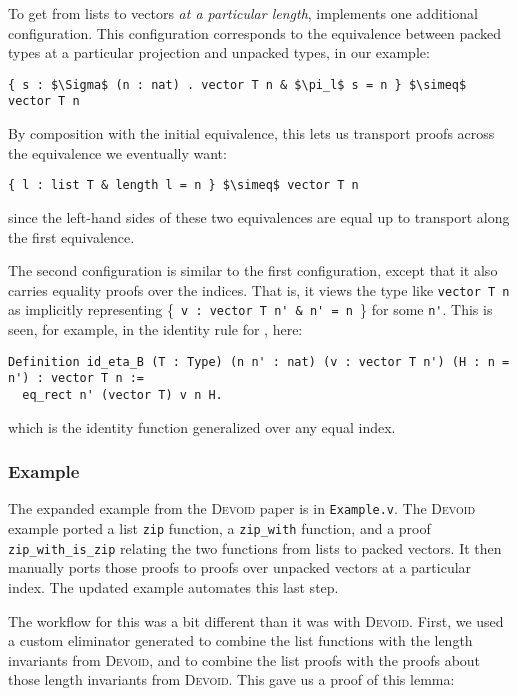 To get from lists to vectors \textit{at a particular length}, \toolname implements one additional configuration.
This configuration corresponds to the equivalence between packed types at a particular projection
and unpacked types, in our example:

\begin{lstlisting}
{ s : $\Sigma$ (n : nat) . vector T n & $\pi_l$ s = n } $\simeq$ vector T n
\end{lstlisting}
By composition with the initial equivalence, this lets us transport proofs
across the equivalence we eventually want:

\begin{lstlisting}
{ l : list T & length l = n } $\simeq$ vector T n
\end{lstlisting}
since the left-hand sides of these two equivalences are equal up to transport along the first equivalence.

The second configuration is similar to the first configuration, except that it also carries equality proofs over the indices.
That is, it views the type \B like \lstinline{vector T n} as implicitly representing \{\lstinline{ v : vector T n' & n' = n }\} for some \lstinline{n'}.
This is seen, for example, in the identity rule for \B, here: 

\begin{lstlisting}
Definition id_eta_B (T : Type) (n n' : nat) (v : vector T n') (H : n = n') : vector T n :=
  eq_rect n' (vector T) v n H.
\end{lstlisting}
which is the identity function generalized over any equal index.

\subsubsection{Example}

The expanded example from the \textsc{Devoid} paper is in \lstinline{Example.v}.
The \textsc{Devoid} example ported a list \lstinline{zip} function,
a \lstinline{zip_with} function, and a proof \lstinline{zip_with_is_zip} relating the two
functions from lists to packed vectors.
It then manually ports those proofs to proofs over unpacked vectors at a particular index.
The updated \toolname example automates this last step.

The workflow for this was a bit different than it was with \textsc{Devoid}.
First, we used a custom eliminator \toolname generated to combine the list functions
with the length invariants from \textsc{Devoid}, and to combine the list proofs
with the proofs about those length invariants from \textsc{Devoid}.
This gave us a proof of this lemma:

